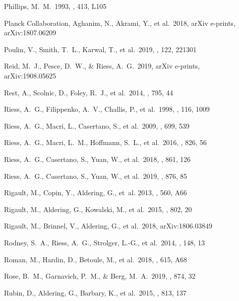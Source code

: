\documentclass[]{aa}
\begin{document}
\begin{thebibliography}{}
 Phillips, M.~M.\ 1993, \apjl, 413, L105

 Planck Collaboration,
Aghanim, N., Akrami, Y., et al.\ 2018, arXiv e-prints, arXiv:1807.06209

 Poulin, V., Smith, T.~L., Karwal, T.,
et al.\ 2019, \prl, 122, 221301


 Reid, M.~J., Pesce, D.~W., \& Riess,
A.~G.\ 2019, arXiv e-prints, arXiv:1908.05625

 Rest, A., Scolnic, D., Foley, R.~J., et
al.\ 2014, \apj, 795, 44

 Riess, A.~G., Filippenko, A.~V.,
Challis, P., et al.\ 1998, \aj, 116, 1009

 Riess, A.~G., Macri, L., Casertano, S.,
et al.\ 2009, \apj, 699, 539

 Riess, A.~G., Macri, L.~M., Hoffmann,
S.~L., et al.\ 2016, \apj, 826, 56

 Riess, A.~G., Casertano, S., Yuan, W.,
et al.\ 2018, \apj, 861, 126

 Riess, A.~G., Casertano, S., Yuan, W.,
et al.\ 2019, \apj, 876, 85

 Rigault, M., Copin, Y.,
Aldering, G., {et~al.} 2013, \aap, 560, A66

 Rigault, M., Aldering, G., Kowalski,
M., et al.\ 2015, \apj, 802, 20

 Rigault, M., Brinnel, V., Aldering,
G., et al.\ 2018, arXiv:1806.03849

 Rodney, S.~A., Riess, A.~G., Strolger,
L.-G., et al.\ 2014, \aj, 148, 13 
  
 Roman, M., Hardin, D., Betoule, M., et
al.\ 2018, \aap, 615, A68

 Rose, B.~M., Garnavich, P.~M., \& Berg,
M.~A.\ 2019, \apj, 874, 32

 Rubin, D., Aldering, G., Barbary, K., et
al.\ 2015, \apj, 813, 137


\end{thebibliography}
\end{document}
